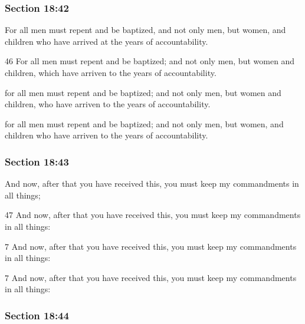 	\subsubsection{Section 18:42} %
		\label{DC18-42}

		For all men must repent and be baptized, and not only men, but women, and children who have arrived at the years of accountability.

		\begin{framed}
		\scriptsize
			\begin{compactdesc}
				\item[JSP] 46 For all men must repent and be baptized; and not only men, but women and children, which have arriven to the years of accountability.
				\item[DC 1835] for all men must repent and be baptized; and not only men, but women and children, who have arriven to the years of accountability.
				\item[DC 1844] for all men must repent and be baptized; and not only men, but women, and children who have arriven to the years of accountability.
			\end{compactdesc}
		\end{framed}

	\subsubsection{Section 18:43} %
		\label{DC18-43}

		And now, after that you have received this, you must keep my commandments in all things;

		\begin{framed}
		\scriptsize
			\begin{compactdesc}
				\item[JSP] 47 And now, after that you have received this, you must keep my commandments in all things:
				\item[DC 1835] 7 And now, after that you have received this, you must keep my commandments in all things: 
				\item[DC 1844] 7 And now, after that you have received this, you must keep my commandments in all things: 
			\end{compactdesc}
		\end{framed}

	\subsubsection{Section 18:44} %
		\label{DC18-44}

